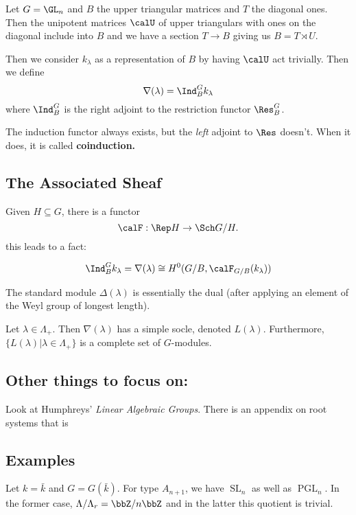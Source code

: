\documentclass[12pt]{article}
\DeclareMathOperator{\SL}{SL}
\begin{document}
\begin{ex}
	Let $G=\GL_n$ and $B$ the upper triangular matrices and $T$ the diagonal ones. Then the unipotent matrices $\calU$ of upper triangulars with ones on the diagonal 
	include into $B$ and we have a section $T\to B$ giving us $B=T\rtimes U$.

	Then we consider $k_\lambda$ as a representation of $B$ by having $\calU$ act trivially. Then we define 
	\[\nabla(\lambda)=\Ind_B^G k_\lambda\]
	where $\Ind_B^G$ is the right adjoint to the restriction functor $\Res^G_B$.
\end{ex}
\begin{rmk}
	The induction functor always exists, but the \textit{left} adjoint to $\Res$ doesn't. When it does, it is called \textbf{coinduction.}
\end{rmk}

\subsection{The Associated Sheaf}
Given $H\subseteq G$, there is a functor
\[\calF:\Rep H\to \Sch G/H.\]
this leads to a fact:
\begin{prop}
	\[\Ind_B^G k_\lambda=\nabla(\lambda)\cong H^0(G/B,\calF_{G/B}(k_\lambda))\]
\end{prop}

The standard module $\Delta(\lambda)$ is essentially the dual (after applying an element of the Weyl group of longest length).
\begin{thm}
	Let $\lambda\in\Lambda_+$. Then $\nabla(\lambda)$ has a simple socle, denoted $L(\lambda)$. Furthermore, $\{L(\lambda)|\lambda\in\Lambda_+\}$ is a complete set of $G$-modules.
\end{thm}

\subsection{Other things to focus on:}
Look at Humphreys' \textit{Linear Algebraic Groups}. There is an appendix on root systems that is 

\subsection{Examples}
Let $k=\bar k$ and $G=G(\bar k)$. For type $A_{n+1}$, we have $\SL_n$ as well as $\operatorname{PGL}_n$. In the former case, $\Lambda/\Lambda_r=\bbZ/n\bbZ$ and in the latter this quotient is trivial.
\end{document}
